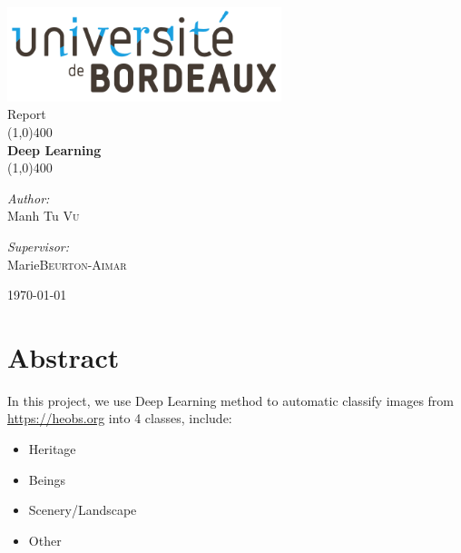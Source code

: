 \documentclass[11pt]{article}
\begin{document}
\begin{titlepage}
	\begin{center}
\includegraphics[width=0.6\textwidth]{images/bordeaux.png}\\[1cm]


{\large Report}\\[0.5cm]	
	
	\line(1,0){400}\\[0.2in]
	\huge{\bfseries Deep Learning}\\
	\line(1,0){400}\\[1.5cm]
	
	\noindent	
	
	\begin{minipage}[t]{0.4\textwidth}
		\begin{flushleft} \large
    	\emph{Author:}\\%
    	Manh Tu \textsc{Vu}
		\end{flushleft}
	\end{minipage}
	\begin{minipage}[t]{0.4\textwidth}
  		\begin{flushright} \large
    		\emph{Supervisor:} \\
    		Marie\textsc{Beurton-Aimar}
  		\end{flushright}
	\end{minipage}
	
	\vfill

{\large \today}
	\end{center}
\end{titlepage}


\tableofcontents
\thispagestyle{empty}
\clearpage


\section*{Abstract}
In this project, we use Deep Learning method to automatic classify images from \href{https://heobs.org}{https://heobs.org} into 4 classes, include:
\begin{itemize}
\item Heritage
\item Beings
\item Scenery/Landscape
\item Other
\end{itemize}
\end{document}
